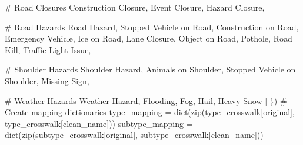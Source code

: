 \documentclass[
  letterpaper,
  DIV=11,
  numbers=noendperiod]{scrartcl}
\newenvironment{Shaded}{\begin{snugshade}}{\end{snugshade}}
\newcommand{\BuiltInTok}[1]{\textcolor[rgb]{0.00,0.23,0.31}{#1}}
\newcommand{\CommentTok}[1]{\textcolor[rgb]{0.37,0.37,0.37}{#1}}
\newcommand{\NormalTok}[1]{\textcolor[rgb]{0.00,0.23,0.31}{#1}}
\newcommand{\OperatorTok}[1]{\textcolor[rgb]{0.37,0.37,0.37}{#1}}
\newcommand{\StringTok}[1]{\textcolor[rgb]{0.13,0.47,0.30}{#1}}
\begin{document}
\begin{Shaded}
\begin{Highlighting}[]
        \CommentTok{\# Road Closures}
        \StringTok{\textquotesingle{}Construction Closure\textquotesingle{}}\NormalTok{,}
        \StringTok{\textquotesingle{}Event Closure\textquotesingle{}}\NormalTok{,}
        \StringTok{\textquotesingle{}Hazard Closure\textquotesingle{}}\NormalTok{,}
        
        \CommentTok{\# Road Hazards}
        \StringTok{\textquotesingle{}Road Hazard\textquotesingle{}}\NormalTok{,}
        \StringTok{\textquotesingle{}Stopped Vehicle on Road\textquotesingle{}}\NormalTok{,}
        \StringTok{\textquotesingle{}Construction on Road\textquotesingle{}}\NormalTok{,}
        \StringTok{\textquotesingle{}Emergency Vehicle\textquotesingle{}}\NormalTok{,}
        \StringTok{\textquotesingle{}Ice on Road\textquotesingle{}}\NormalTok{,}
        \StringTok{\textquotesingle{}Lane Closure\textquotesingle{}}\NormalTok{,}
        \StringTok{\textquotesingle{}Object on Road\textquotesingle{}}\NormalTok{,}
        \StringTok{\textquotesingle{}Pothole\textquotesingle{}}\NormalTok{,}
        \StringTok{\textquotesingle{}Road Kill\textquotesingle{}}\NormalTok{,}
        \StringTok{\textquotesingle{}Traffic Light Issue\textquotesingle{}}\NormalTok{,}
        
        \CommentTok{\# Shoulder Hazards}
        \StringTok{\textquotesingle{}Shoulder Hazard\textquotesingle{}}\NormalTok{,}
        \StringTok{\textquotesingle{}Animals on Shoulder\textquotesingle{}}\NormalTok{,}
        \StringTok{\textquotesingle{}Stopped Vehicle on Shoulder\textquotesingle{}}\NormalTok{,}
        \StringTok{\textquotesingle{}Missing Sign\textquotesingle{}}\NormalTok{,}
        
        \CommentTok{\# Weather Hazards}
        \StringTok{\textquotesingle{}Weather Hazard\textquotesingle{}}\NormalTok{,}
        \StringTok{\textquotesingle{}Flooding\textquotesingle{}}\NormalTok{,}
        \StringTok{\textquotesingle{}Fog\textquotesingle{}}\NormalTok{,}
        \StringTok{\textquotesingle{}Hail\textquotesingle{}}\NormalTok{,}
        \StringTok{\textquotesingle{}Heavy Snow\textquotesingle{}}
\NormalTok{    ]}
\NormalTok{\})}
\CommentTok{\# Create mapping dictionaries}
\NormalTok{type\_mapping }\OperatorTok{=} \BuiltInTok{dict}\NormalTok{(}\BuiltInTok{zip}\NormalTok{(type\_crosswalk[}\StringTok{\textquotesingle{}original\textquotesingle{}}\NormalTok{], type\_crosswalk[}\StringTok{\textquotesingle{}clean\_name\textquotesingle{}}\NormalTok{]))}
\NormalTok{subtype\_mapping }\OperatorTok{=} \BuiltInTok{dict}\NormalTok{(}\BuiltInTok{zip}\NormalTok{(subtype\_crosswalk[}\StringTok{\textquotesingle{}original\textquotesingle{}}\NormalTok{], subtype\_crosswalk[}\StringTok{\textquotesingle{}clean\_name\textquotesingle{}}\NormalTok{]))}


\end{Highlighting}
\end{Shaded}
\end{document}
